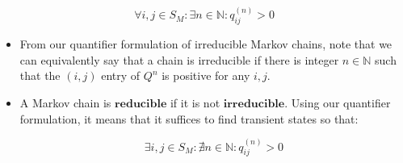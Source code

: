 $$\forall i,j \in S_M: \exists n \in \mathbb{N} : q_{ij}^{(n)} > 0$$
\begin{itemize}
\item From our quantifier formulation of irreducible Markov chains, note that we can equivalently say that a chain is irreducible if there is integer $n \in \mathbb{N}$ such that the $(i,j)$ entry of $Q^n$ is positive for any $i,j$.

\item A Markov chain is $\textbf{reducible}$ if it is not $\textbf{irreducible}$. Using our quantifier formulation, it means that it suffices to find transient states so that:

$$\exists i,j \in S_M: \nexists n \in \mathbb{N} : q_{ij}^{(n)} > 0$$
\end{itemize}
